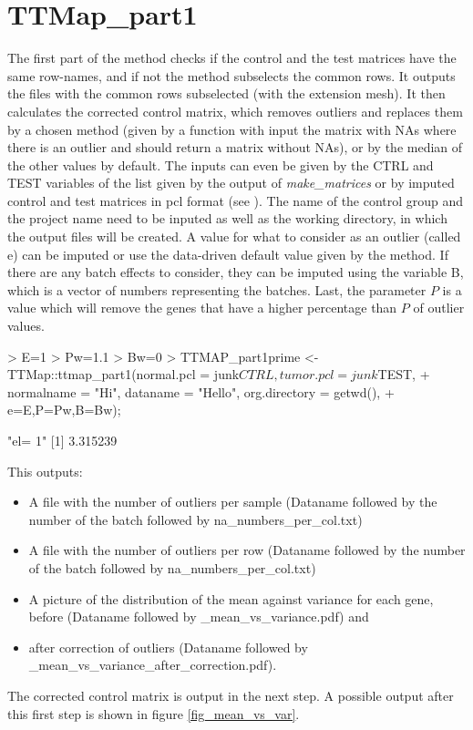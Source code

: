 \documentclass[a4paper,12pt]{article}
\begin{document}
\section{TTMap\_part1}
The first part of the method checks if the control and the test matrices have the same row-names, and if not the method subselects the common rows. It outputs the files with the common rows subselected (with the extension mesh).  It then calculates the corrected control matrix, which removes outliers and replaces them by a chosen method (given by a function with input the matrix with NAs where there is an outlier and should return a matrix without NAs), or by the median of the other values by default. The inputs can even be given by the CTRL and TEST variables of the list given by the output of \emph{make\_matrices} or by imputed control and test matrices in pcl format (see \cite{Monica}). The name of the control group and the project name need to be inputed as well as the working directory, in which the output files will be created. A value for what to consider as an outlier (called e) can be imputed or use the data-driven default value given by the method. If there are any batch effects to consider, they can be imputed using the variable B, which is a vector of numbers representing the batches. Last, the parameter $P$ is a value which will remove the genes that have a higher percentage than $P$ of outlier values. 

%
\begin{scriptsize}
\begin{Schunk}
\begin{Sinput}
> E=1
> Pw=1.1
> Bw=0
> TTMAP_part1prime <-TTMap::ttmap_part1(normal.pcl = junk$CTRL,tumor.pcl = junk$TEST, 
+ normalname = "Hi", dataname = "Hello", org.directory = getwd(),
+ e=E,P=Pw,B=Bw);
\end{Sinput}
\begin{Soutput}
[1] "el= 1"
[1] 3.315239
\end{Soutput}
\end{Schunk}
\end{scriptsize}

This outputs: 

\begin{itemize}
\item A file with the number of outliers per sample (Dataname followed by the number of the batch followed by na\_numbers\_per\_col.txt)
\item A file with the number of outliers per row (Dataname followed by the number of the batch followed by na\_numbers\_per\_col.txt)
\item A picture of the distribution of the mean against variance for each gene, before (Dataname followed by \_mean\_vs\_variance.pdf) and
\item after correction of outliers (Dataname followed by \_mean\_vs\_variance\_after\_correction.pdf).
\end{itemize}
The corrected control matrix is output in the next step.
A possible output after this first step is shown in figure \ref{fig_mean_vs_var}.
                                                                                                                                           
\end{document}
